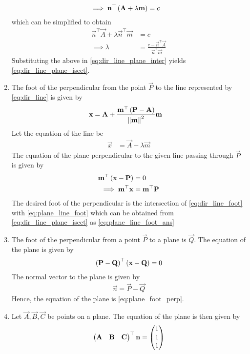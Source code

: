 \documentclass[journal,12pt,onecolumn]{IEEEtran}
\renewcommand\thesection{\arabic{section}}
\renewcommand\thesubsection{\thesection.\arabic{subsection}}
\begin{document}
\begin{enumerate}[label=\thesubsection.\arabic*.,ref=\thesubsection.\theenumi]
\begin{align}
	\implies 
	\mathbf{n}^{\top}\left(\mathbf{A} + \lambda \mathbf{m}\right)&= c
	\label{eq:dir_line_plane_inter}
\end{align}
which can be simplified to obtain
\begin{align}
	\vec{n}^{\top}\vec{A} + \lambda 	\vec{n}^{\top}\vec{m}&= c
	\\
	\implies \lambda &= \frac{c - \vec{n}^{\top}\vec{A}}{\vec{n}^{\top}\vec{m}}
\end{align}
Substituting the above in 
	\eqref{eq:dir_line_plane_inter}
	yields
	\eqref{eq:dir_line_plane_isect}.
\item The foot of the perpendicular from the point $\vec{P}$ to the line  represented by 
	\eqref{eq:dir_line}
	is given by 
\begin{align}
	\label{eq:plane_line_foot_ans}
	\mathbf{x} &= \mathbf{A} + \frac{ \mathbf{m}^{\top}\left(\mathbf{P} - \mathbf{A}\right)}{\left\lVert\mathbf{m}\right\rVert^2}
\mathbf{m}
\end{align}
\solution  Let the equation of the line be 
\begin{align}
	\label{eq:dir_line_foot}
	\vec{x} &= \vec{A} + \lambda \vec{m}
\end{align}
	The equation of the plane perpendicular to the given line passing through $\vec{P}$ is given by
\begin{align}
	\label{eq:plane_line_foot}
	\mathbf{m}^{\top}\left(\mathbf{x}-\mathbf{P}\right)  &= 0
	\\
	\implies \mathbf{m}^{\top}\mathbf{x}  &= \mathbf{m}^{\top}\mathbf{P}
\end{align}
The desired foot of the perpendicular is the intersection of 
	\eqref{eq:dir_line_foot} with 
	\eqref{eq:plane_line_foot}
	which can be obtained from 
	\eqref{eq:dir_line_plane_isect}
	as 
	\eqref{eq:plane_line_foot_ans}
\item The foot of the perpendicular from a point $\vec{P}$ to a plane is $\vec{Q}$.  The equation of the plane is given by 
\begin{align}
	\label{eq:plane_foot_perp}
	\left(\mathbf{P}-\mathbf{Q}\right)^{\top}\left(\mathbf{x}-\mathbf{Q}\right) = 0
\end{align}
	\solution  The normal vector to the plane is given by 
\begin{align}
	\vec{n}= \vec{P}-\vec{Q} 
\end{align}
	Hence, the equation of the plane is
	\eqref{eq:plane_foot_perp}.
\item Let $\vec{A}, \vec{B}, \vec{C}$ be  points on a plane.  The equation of the plane is then given by 	
\begin{align}
	\myvec{	\vec{A} & \vec{B}& \vec{C}}^{\top} \vec{n}= \myvec{1\\1\\1}

\end{align}
\end{enumerate}
\end{document}
